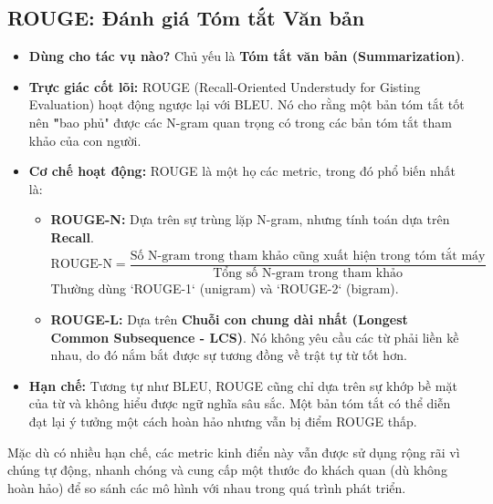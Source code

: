 \subsection{ROUGE: Đánh giá Tóm tắt Văn bản}
\label{ssec:rouge}
\begin{itemize}
    \item \textbf{Dùng cho tác vụ nào?} Chủ yếu là \textbf{Tóm tắt văn bản (Summarization)}.
    \item \textbf{Trực giác cốt lõi:} ROUGE (Recall-Oriented Understudy for Gisting Evaluation) hoạt động ngược lại với BLEU. Nó cho rằng một bản tóm tắt tốt nên \textbf "bao phủ" được các N-gram quan trọng có trong các bản tóm tắt tham khảo của con người.
    \item \textbf{Cơ chế hoạt động:} ROUGE là một họ các metric, trong đó phổ biến nhất là:
        \begin{itemize}
            \item \textbf{ROUGE-N:} Dựa trên sự trùng lặp N-gram, nhưng tính toán dựa trên \textbf{Recall}.
                $$ \text{ROUGE-N} = \frac{\text{Số N-gram trong tham khảo cũng xuất hiện trong tóm tắt máy}}{\text{Tổng số N-gram trong tham khảo}} $$
                Thường dùng `ROUGE-1` (unigram) và `ROUGE-2` (bigram).
            \item \textbf{ROUGE-L:} Dựa trên \textbf{Chuỗi con chung dài nhất (Longest Common Subsequence - LCS)}. Nó không yêu cầu các từ phải liền kề nhau, do đó nắm bắt được sự tương đồng về trật tự từ tốt hơn.
        \end{itemize}
    \item \textbf{Hạn chế:} Tương tự như BLEU, ROUGE cũng chỉ dựa trên sự khớp bề mặt của từ và không hiểu được ngữ nghĩa sâu sắc. Một bản tóm tắt có thể diễn đạt lại ý tưởng một cách hoàn hảo nhưng vẫn bị điểm ROUGE thấp.
\end{itemize}

Mặc dù có nhiều hạn chế, các metric kinh điển này vẫn được sử dụng rộng rãi vì chúng tự động, nhanh chóng và cung cấp một thước đo khách quan (dù không hoàn hảo) để so sánh các mô hình với nhau trong quá trình phát triển.